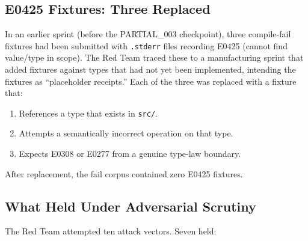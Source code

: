 \subsection{E0425 Fixtures: Three Replaced}

In an earlier sprint (before the PARTIAL\_003 checkpoint), three compile-fail
fixtures had been submitted with \texttt{.stderr} files recording E0425
(cannot find value/type in scope). The Red Team traced these to a manufacturing
sprint that added fixtures against types that had not yet been implemented,
intending the fixtures as ``placeholder receipts.'' Each of the three was
replaced with a fixture that:

\begin{enumerate}
  \item References a type that exists in \texttt{src/}.
  \item Attempts a semantically incorrect operation on that type.
  \item Expects E0308 or E0277 from a genuine type-law boundary.
\end{enumerate}

After replacement, the fail corpus contained zero E0425 fixtures.

\subsection{What Held Under Adversarial Scrutiny}

The Red Team attempted ten attack vectors. Seven held:

